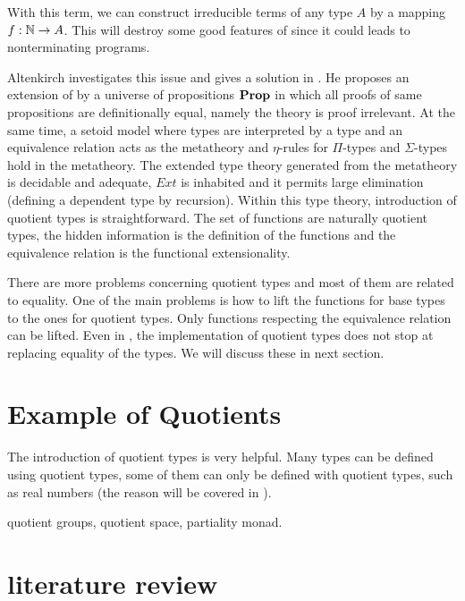 
With this term, we can construct irreducible terms of any type $A$ by a
mapping $f : \mathbb{N} \rightarrow A$. This will destroy some good features of \itt
since it could leads to nonterminating programs.

Altenkirch investigates this issue and gives a solution in
\cite{alti:lics99}. He proposes an extension of \itt by a universe of
propositions $\operatorname{\mathbf{Prop}}$ in which all proofs of same propositions are
definitionally equal, namely the theory is proof irrelevant. At the same time,
a setoid model where types are interpreted by a type and an equivalence relation acts as the metatheory and $\eta$-rules for
$\Pi$-types and $\Sigma$-types hold in the metatheory. The extended type
theory generated from the metatheory is decidable and adequate, $Ext$ is
inhabited and it permits large elimination (defining a dependent type by recursion). Within this type theory,
introduction of quotient types is straightforward. 
The set of functions are naturally quotient types, the hidden information is the
definition of the functions and the equivalence relation is the
functional extensionality.

There are more problems concerning quotient types and most
of them are related to equality. One of the main problems is how to lift the functions for
base types to the ones for quotient types. Only functions respecting the
equivalence relation can be lifted. Even in \ett, the implementation
of quotient types does not stop at replacing equality of the types. We
will discuss these in next section.



\section{Example of Quotients}

The introduction of quotient types is very helpful. Many types can be
defined using quotient types, some of them can only be defined with quotient types, such as real
numbers (the reason will be covered in \todo).




quotient groups, quotient space, partiality monad.


\section{literature review}


